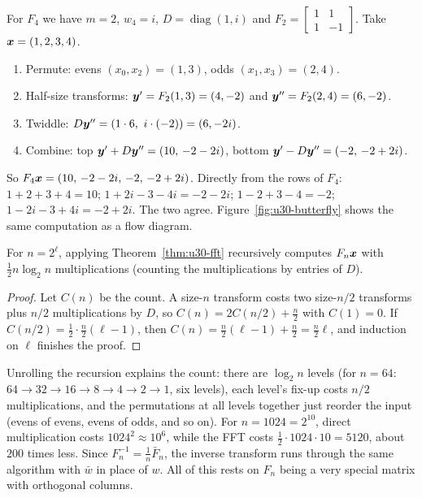 \begin{example}\label{ex:u30-fft4}
For $F_4$ we have $m=2$, $w_4=i$, $D=\operatorname{diag}(1,i)$ and $F_2=\left[\begin{smallmatrix}1&1\\1&-1\end{smallmatrix}\right]$.
Take $\boldsymbol{x}=(1,2,3,4)$.
\begin{enumerate}
  \item Permute: evens $(x_0,x_2)=(1,3)$, odds $(x_1,x_3)=(2,4)$.
  \item Half-size transforms: $\boldsymbol{y}'=F_2(1,3)=(4,-2)$ and $\boldsymbol{y}''=F_2(2,4)=(6,-2)$.
  \item Twiddle: $D\vb{y}''=(1\cdot6,\ i\cdot(-2))=(6,-2i)$.
  \item Combine: top $\boldsymbol{y}'+D\boldsymbol{y}''=(10,\,-2-2i)$, bottom $\boldsymbol{y}'-D\boldsymbol{y}''=(-2,\,-2+2i)$.
\end{enumerate}
So $F_4\boldsymbol{x}=(10,\,-2-2i,\,-2,\,-2+2i)$. Directly from the rows of $F_4$:
$1+2+3+4=10$; $1+2i-3-4i=-2-2i$; $1-2+3-4=-2$; $1-2i-3+4i=-2+2i$. The two agree.
Figure~\ref{fig:u30-butterfly} shows the same computation as a flow diagram.
\end{example}

\begin{proposition}\label{prop:u30-count}
For $n=2^\ell$, applying Theorem~\ref{thm:u30-fft} recursively computes $F_n\boldsymbol{x}$ with
$\tfrac12 n\log_2 n$ multiplications (counting the multiplications by entries of $D$).
\end{proposition}
\begin{proof}
Let $C(n)$ be the count. A size-$n$ transform costs two size-$n/2$ transforms plus $n/2$
multiplications by $D$, so $C(n)=2C(n/2)+\tfrac n2$ with $C(1)=0$. If $C(n/2)=\tfrac12\cdot\tfrac n2(\ell-1)$,
then $C(n)=\tfrac n2(\ell-1)+\tfrac n2=\tfrac n2\ell$, and induction on $\ell$ finishes the proof.
\end{proof}

Unrolling the recursion explains the count: there are $\log_2 n$ levels (for $n=64$: $64\to32\to16\to8\to4\to2\to1$,
six levels), each level's fix-up costs $n/2$ multiplications, and the permutations at all
levels together just reorder the input (evens of evens, evens of odds, and so on). For
$n=1024=2^{10}$, direct multiplication costs $1024^2\approx 10^6$, while the FFT costs
$\tfrac12\cdot1024\cdot10=5120$, about $200$ times less. Since $F_n^{-1}=\frac1n\bar F_n$, the inverse
transform runs through the same algorithm with $\bar w$ in place of $w$. All of this rests on
$F_n$ being a very special matrix with orthogonal columns.

